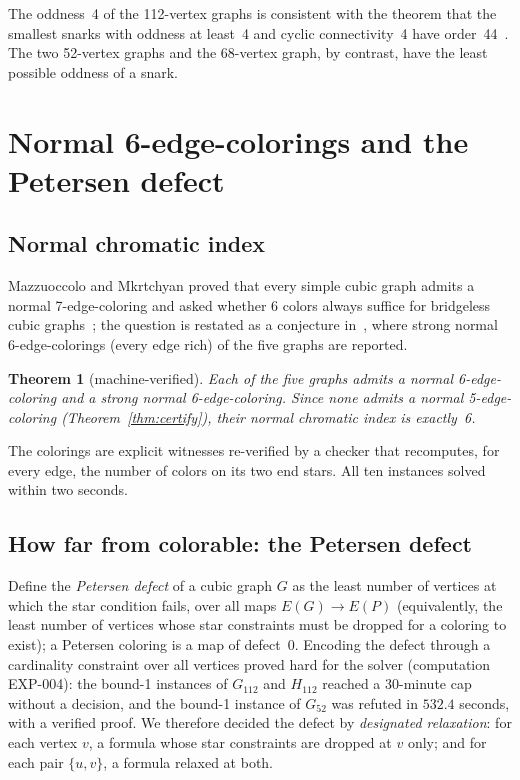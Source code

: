 \documentclass[11pt]{article}
\newtheorem{theorem}{Theorem}[section]
\theoremstyle{definition}
\theoremstyle{remark}
\newcommand{\PG}{P}
\newcommand{\Gmain}{G_{112}}
\newcommand{\Gsym}{H_{112}}
\newcommand{\Gfty}{G_{52}}
\begin{document}
The oddness~4 of the 112-vertex graphs
is consistent with the theorem that the smallest snarks with oddness at
least~4 and cyclic connectivity~4 have order~44~\cite{GMS2019}. The two 52-vertex graphs and the
68-vertex graph, by contrast, have the least possible oddness of a snark.

\section{Normal 6-edge-colorings and the Petersen defect}\label{sec:normal}

\subsection{Normal chromatic index}

Mazzuoccolo and Mkrtchyan proved that every simple cubic graph admits a normal 7-edge-coloring
and asked whether 6 colors always suffice for bridgeless cubic graphs~\cite{MazzMkrt2020}; the
question is restated as a conjecture in~\cite{GJMMM2026, GJMMMU2026}, where strong normal
6-edge-colorings (every edge rich) of the five graphs are reported.

\begin{theorem}[machine-verified]\label{thm:normal6}
Each of the five graphs admits a normal 6-edge-coloring and a strong normal
6-edge-coloring. Since none admits a normal 5-edge-coloring (Theorem~\ref{thm:certify}), their
normal chromatic index is exactly~6.
\end{theorem}

The colorings are explicit witnesses re-verified by a checker that recomputes, for every edge,
the number of colors on its two end stars. All ten instances solved within two seconds.

\subsection{How far from colorable: the Petersen defect}

Define the \emph{Petersen defect} of a cubic graph $G$ as the least number of vertices at which
the star condition fails, over all maps $E(G) \to E(\PG)$ (equivalently, the least number of
vertices whose star constraints must be dropped for a coloring to exist); a Petersen coloring is
a map of defect~0. Encoding the defect through a cardinality constraint over all vertices proved
hard for the solver (computation EXP-004): the bound-1 instances of $\Gmain$ and $\Gsym$ reached a
30-minute cap without a decision, and the bound-1 instance of $\Gfty$ was refuted in $532.4$
seconds, with a verified proof. We therefore decided the defect by \emph{designated relaxation}:
for each vertex $v$, a formula whose star
constraints are dropped at $v$ only; and for each pair $\{u, v\}$, a formula relaxed at both.
\end{document}
